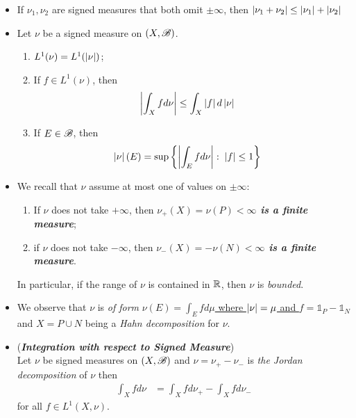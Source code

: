 \documentclass[11pt]{article}
\begin{document}
\begin{itemize}
\item \begin{proposition}
If $\nu_1, \nu_2$ are signed measures that both omit $\pm \infty$, then $\left\lvert \nu_1 + \nu_2 \right\rvert \le \left\lvert \nu_1 \right\rvert + \left\lvert \nu_2 \right\rvert$
\end{proposition}

\item \begin{exercise}
Let $\nu$ be a signed measure on $(X, {\mathscr B})$. 
\begin{enumerate}
\item $L^1(\nu) = L^{1}(\left\lvert \nu \right\rvert)$;
\item If $f \in L^1(\nu)$,  then
\begin{align*}
\left\lvert \int_X f d\nu \right\rvert &\le \int_X \left\lvert f \right\rvert d\left\lvert \nu \right\rvert
\end{align*}
\item If $E \in {\mathscr B}$, then 
\begin{align*}
\left\lvert \nu \right\rvert(E) &= \sup\left\{\left\lvert \int_E f d\nu \right\rvert: \; \left\lvert f \right\rvert \le 1\right\}
\end{align*}
\end{enumerate}
\end{exercise}

\item \begin{remark} 
We recall that $\nu$ assume at most one of values on $\pm \infty$:
\begin{enumerate}
\item If $\nu$ does not take $+\infty$, then \emph{\textbf{$\nu_{+}(X)  = \nu(P)<\infty$ is a finite measure}};
\item if $\nu$ does not take $-\infty$, then \emph{\textbf{$\nu_{-}(X)  = -\nu(N)<\infty$ is a finite measure}}.
\end{enumerate}
In particular, if the range of $\nu$ is contained in ${\mathbb R}$, then $\nu$ is \emph{bounded}.
\end{remark}

\item \begin{remark} 
We observe that $\nu$ is \emph{of form} \underline{$\nu(E) = \int_{E} f d\mu$ where $\left\lvert \nu \right\rvert= \mu$ and $f= \mathds{1}_{P} -\mathds{1}_{N}$} and $X = P\cup N$ being a \emph{Hahn decomposition} for $\nu$.
\end{remark}


\item \begin{remark} (\emph{\textbf{Integration with respect to Signed Measure}})\\
Let $\nu$ be  signed measures on $(X, {\mathscr B})$ and $\nu = \nu_{+} - \nu_{-}$ is \emph{the Jordan decomposition} of $\nu$ then 
\begin{align*}
\int_{X} f d\nu &= \int_{X} f d\nu_{+} - \int_{X} f d\nu_{-}
\end{align*} for all $f\in L^{1}(X,\nu)$.
\end{remark}


\end{itemize}
\end{document}

